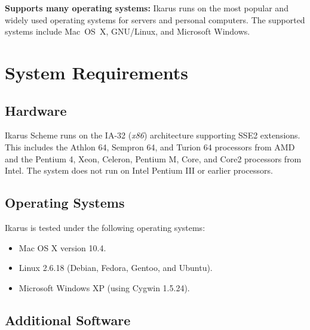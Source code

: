 \documentclass[onecolumn, 12pt, twoside, openright, dvipdfm]{book}
\begin{document}
\textbf{Supports many operating systems:} Ikarus runs on the most
popular and widely used operating systems for servers and personal
computers.  The supported systems include Mac~OS~X,
GNU/Linux, and Microsoft Windows.


\section{System Requirements}

\subsection{Hardware}

Ikarus Scheme runs on the IA-32 (\emph{x86}) architecture
supporting SSE2 extensions.  This includes the Athlon 64,
Sempron 64, and Turion 64 processors from AMD and the Pentium 4, Xeon,
Celeron, Pentium M, Core, and Core2 processors from Intel.  The
system does not run on Intel Pentium III or earlier
processors.

\subsection{Operating Systems}

Ikarus is tested under the following operating systems:

\begin{itemize}
\item Mac OS X version 10.4.
\item Linux 2.6.18 (Debian, Fedora, Gentoo, and Ubuntu).
\item Microsoft Windows XP (using Cygwin 1.5.24).
\end{itemize}

\subsection{Additional Software}
\end{document}
